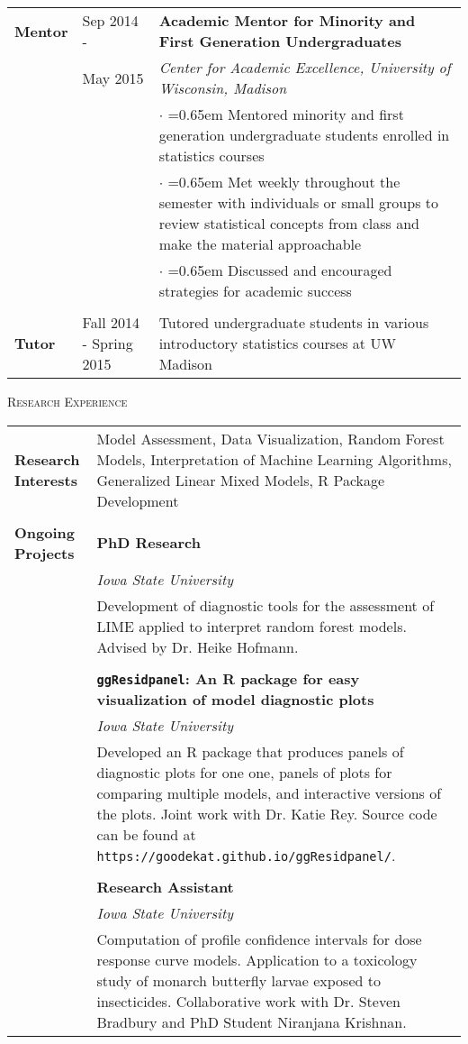 \documentclass[10pt, oneside]{article}
\begin{document}
\begin{longtable}{p{1.4cm}p{2.1cm}p{13cm}}
\\
\textbf{Mentor} & \hfill{Sep 2014 - } & \textbf{Academic Mentor for Minority and First Generation Undergraduates}\\
& \hfill{May 2015} & \emph{Center for Academic Excellence, University of Wisconsin, Madison} \vspace{0.1cm}\\
& &  $\cdot$ \hangindent=0.65em \hangafter=1 Mentored minority and first generation undergraduate students enrolled in statistics courses\\
& & $\cdot$ \hangindent=0.65em \hangafter=1 Met weekly throughout the semester with individuals or small groups to review statistical concepts from class and make the material approachable\\
& & $\cdot$ \hangindent=0.65em \hangafter=1 Discussed and encouraged strategies for academic success\\
\\
\textbf{Tutor} & \hfill{Fall 2014 - Spring 2015} & Tutored undergraduate students in various introductory statistics courses at UW Madison
\end{longtable}

\noindent \textsc{Research Experience} \hrulefill

\begin{longtable}{p{3.5cm}p{13cm}}
\textbf{Research Interests} & Model Assessment, Data Visualization, Random Forest Models, Interpretation of Machine Learning Algorithms, Generalized Linear Mixed Models, R Package Development\\
\\
\textbf{Ongoing Projects} & \textbf{PhD Research}\\
& \emph{Iowa State University}\\
& Development of diagnostic tools for the assessment of LIME applied to interpret random forest models. Advised by Dr. Heike Hofmann.\\
\\
& \textbf{\texttt{ggResidpanel}: An R package for easy visualization of model diagnostic plots}\\
& \emph{Iowa State University}\\
& Developed an R package that produces panels of diagnostic plots for one one, panels of plots for comparing multiple models, and interactive versions of the plots. Joint work with Dr. Katie Rey. Source code can be found at \texttt{https://goodekat.github.io/ggResidpanel/}.\\
\\
& \textbf{Research Assistant}\\
& \emph{Iowa State University}\\
& Computation of profile confidence intervals for dose response curve models. Application to a toxicology study of monarch butterfly larvae exposed to insecticides. Collaborative work with Dr. Steven Bradbury and PhD Student Niranjana Krishnan.
\end{longtable}
\end{document}
